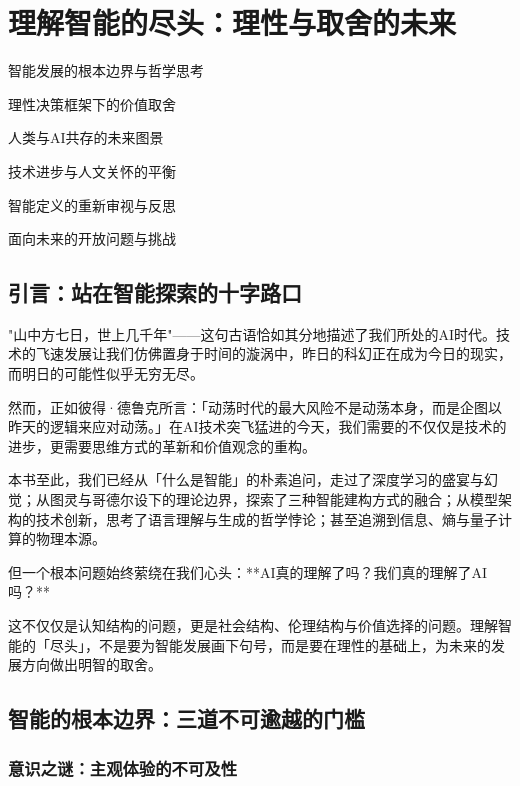 \chapter{理解智能的尽头：理性与取舍的未来}

\begin{introduction}
\item 智能发展的根本边界与哲学思考
\item 理性决策框架下的价值取舍
\item 人类与AI共存的未来图景
\item 技术进步与人文关怀的平衡
\item 智能定义的重新审视与反思
\item 面向未来的开放问题与挑战
\end{introduction}

\section{引言：站在智能探索的十字路口}

"山中方七日，世上几千年"——这句古语恰如其分地描述了我们所处的AI时代。技术的飞速发展让我们仿佛置身于时间的漩涡中，昨日的科幻正在成为今日的现实，而明日的可能性似乎无穷无尽。

然而，正如彼得·德鲁克所言：「动荡时代的最大风险不是动荡本身，而是企图以昨天的逻辑来应对动荡。」在AI技术突飞猛进的今天，我们需要的不仅仅是技术的进步，更需要思维方式的革新和价值观念的重构。

本书至此，我们已经从「什么是智能」的朴素追问，走过了深度学习的盛宴与幻觉；从图灵与哥德尔设下的理论边界，探索了三种智能建构方式的融合；从模型架构的技术创新，思考了语言理解与生成的哲学悖论；甚至追溯到信息、熵与量子计算的物理本源。

但一个根本问题始终萦绕在我们心头：**AI真的理解了吗？我们真的理解了AI吗？**

这不仅仅是认知结构的问题，更是社会结构、伦理结构与价值选择的问题。理解智能的「尽头」，不是要为智能发展画下句号，而是要在理性的基础上，为未来的发展方向做出明智的取舍。

\section{智能的根本边界：三道不可逾越的门槛}

\subsection{意识之谜：主观体验的不可及性}


